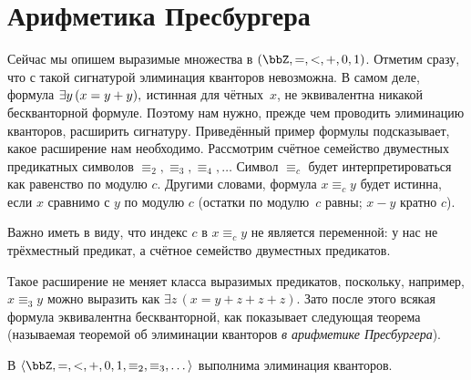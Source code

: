 \section{Арифметика Пресбургера}
%
        \label{presburger}%
Сейчас мы опишем выразимые множества в
$(\bbZ,{=},{<},{+},0,1)$. Отметим сразу, что с такой сигнатурой элиминация кванторов невозможна. В
самом деле, формула
        $
\exists y\, (x\hm={y+y}),
        $
истинная для чётных~$x$, не эквивалентна никакой бескванторной
формуле. Поэтому нам нужно, прежде чем проводить элиминацию
кванторов, расширить сигнатуру. Приведённый пример формулы
подсказывает, какое расширение нам необходимо. Рассмотрим
счётное семейство двуместных предикатных символов $\equiv_2,
\equiv_3,\equiv_4,\dots$ Символ $\equiv_c$ будет
интерпретироваться как равенство по модулю $c$. Другими словами,
формула $x\equiv_c y$ будет истинна, если
$x$ сравнимо с $y$ по модулю $c$ (остатки по модулю~$c$ равны;
$x-y$ кратно $c$).

Важно иметь в виду, что индекс
$c$ в $x\equiv_c y$ не является переменной:
у нас не трёхместный предикат, а счётное семейство двуместных
предикатов.

Такое расширение не меняет класса выразимых
предикатов, поскольку, например, $x\equiv_3 y$ можно выразить
как $\exists z\, (x=y+z+z+z)$. Зато после этого всякая формула
эквивалентна бескванторной, как показывает следующая теорема
(называемая теоремой об элиминации кванторов \emph{в арифметике
Пресбургера}).%

\begin{theorem}%
%
        \label{presburger-arithmetic}%
В $\langle\bbZ,=,<,+,0,1,\equiv_2,\equiv_3,\dots\rangle$ выполнима
элиминация кванторов.
\end{theorem}


